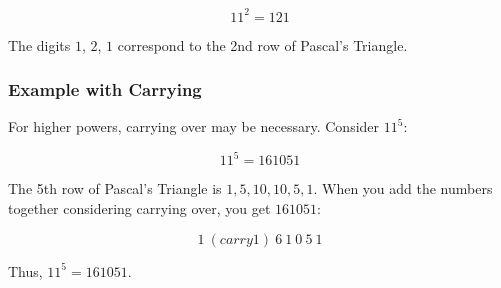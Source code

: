 \documentclass[12pt]{article}
\begin{document}
\[
11^2 = 121
\]

The digits \(1\), \(2\), \(1\) correspond to the 2nd row of Pascal's Triangle.

\subsubsection*{Example with Carrying}

For higher powers, carrying over may be necessary. Consider \(11^5\):

\[
11^5 = 161051
\]

The 5th row of Pascal's Triangle is \(1, 5, 10, 10, 5, 1\). When you add the numbers together considering carrying over, you get \(161051\):

\[
1\ (carry 1)\ 6\ 1\ 0\ 5\ 1
\]

Thus, \(11^5 = 161051\).
\end{document}
